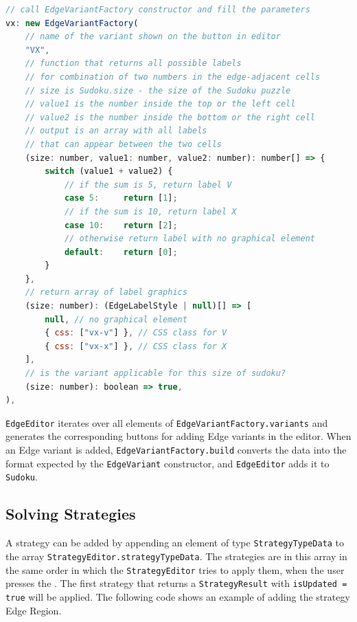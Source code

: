 \noindent
\begin{minipage}{\textwidth}
\begin{lstlisting}[language=JavaScript]
// call EdgeVariantFactory constructor and fill the parameters
vx: new EdgeVariantFactory(
    // name of the variant shown on the button in editor
    "VX",
    // function that returns all possible labels
    // for combination of two numbers in the edge-adjacent cells
    // size is Sudoku.size - the size of the Sudoku puzzle
    // value1 is the number inside the top or the left cell
    // value2 is the number inside the bottom or the right cell
    // output is an array with all labels
    // that can appear between the two cells
    (size: number, value1: number, value2: number): number[] => {
        switch (value1 + value2) {
            // if the sum is 5, return label V
            case 5:     return [1];
            // if the sum is 10, return label X
            case 10:    return [2];
            // otherwise return label with no graphical element
            default:    return [0];
        }
    },
    // return array of label graphics
    (size: number): (EdgeLabelStyle | null)[] => [
        null, // no graphical element
        { css: ["vx-v"] }, // CSS class for V
        { css: ["vx-x"] }, // CSS class for X
    ],
    // is the variant applicable for this size of sudoku?
    (size: number): boolean => true,
),
\end{lstlisting}
\end{minipage}

\texttt{EdgeEditor} iterates over all elements of \texttt{EdgeVariantFactory.variants}
and generates the corresponding buttons for adding Edge variants in the editor.
When an Edge variant is added, \texttt{EdgeVariantFactory.build} converts the data into
the format expected by the \texttt{EdgeVariant} constructor,
and \texttt{EdgeEditor} adds it to \texttt{Sudoku}.

\subsection*{Solving Strategies}

A strategy can be added by appending an element of type \texttt{StrategyTypeData}
to the array \texttt{StrategyEditor.strategyTypeData}.
The strategies are in this array in the same order in which the \texttt{StrategyEditor} tries to apply them,
when the user presses the .
The first strategy that returns a \texttt{StrategyResult} with \texttt{isUpdated = true} will be applied.
The following code shows an example of adding the strategy Edge Region.

